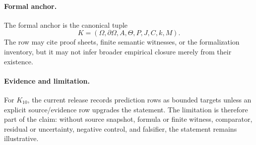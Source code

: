 \paragraph{Formal anchor.}
The formal anchor is the canonical tuple
\[
  K=(\Omega,\partial\Omega,A,\Theta,P,J,C,k,M).
\]
The row may cite proof sheets, finite semantic witnesses, or the formalization
inventory, but it may not infer broader empirical closure merely from their
existence.

\paragraph{Evidence and limitation.}
For \(K_10\), the current release records prediction rows as bounded
targets unless an explicit source/evidence row upgrades the statement. The
limitation is therefore part of the claim: without source snapshot, formula or
finite witness, comparator, residual or uncertainty, negative control, and
falsifier, the statement remains illustrative.

